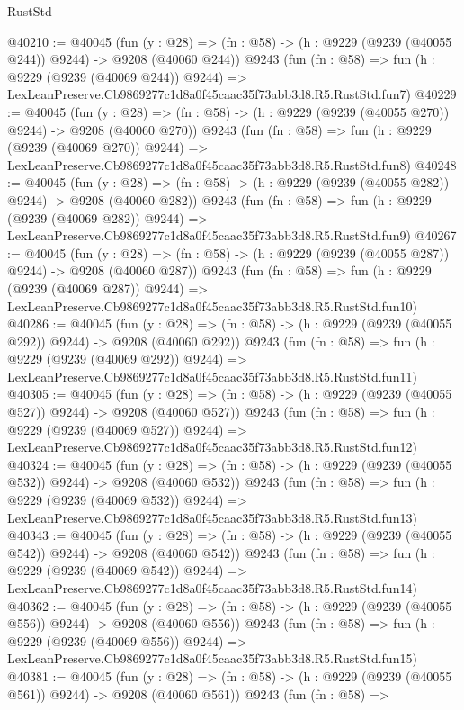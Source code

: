 \begin{lexlean}{RustStd}
\begin{coremodule}
@40210 := @40045
    (fun (y : @28) => (fn : @58) -> (h : @9229 (@9239 (@40055 @244)) @9244) -> @9208 (@40060 @244))
    @9243
    (fun (fn : @58) =>
    fun (h : @9229 (@9239 (@40069 @244)) @9244) =>
    LexLeanPreserve.Cb9869277c1d8a0f45caac35f73abb3d8.R5.RustStd.fun7)
@40229 := @40045
    (fun (y : @28) => (fn : @58) -> (h : @9229 (@9239 (@40055 @270)) @9244) -> @9208 (@40060 @270))
    @9243
    (fun (fn : @58) =>
    fun (h : @9229 (@9239 (@40069 @270)) @9244) =>
    LexLeanPreserve.Cb9869277c1d8a0f45caac35f73abb3d8.R5.RustStd.fun8)
@40248 := @40045
    (fun (y : @28) => (fn : @58) -> (h : @9229 (@9239 (@40055 @282)) @9244) -> @9208 (@40060 @282))
    @9243
    (fun (fn : @58) =>
    fun (h : @9229 (@9239 (@40069 @282)) @9244) =>
    LexLeanPreserve.Cb9869277c1d8a0f45caac35f73abb3d8.R5.RustStd.fun9)
@40267 := @40045
    (fun (y : @28) => (fn : @58) -> (h : @9229 (@9239 (@40055 @287)) @9244) -> @9208 (@40060 @287))
    @9243
    (fun (fn : @58) =>
    fun (h : @9229 (@9239 (@40069 @287)) @9244) =>
    LexLeanPreserve.Cb9869277c1d8a0f45caac35f73abb3d8.R5.RustStd.fun10)
@40286 := @40045
    (fun (y : @28) => (fn : @58) -> (h : @9229 (@9239 (@40055 @292)) @9244) -> @9208 (@40060 @292))
    @9243
    (fun (fn : @58) =>
    fun (h : @9229 (@9239 (@40069 @292)) @9244) =>
    LexLeanPreserve.Cb9869277c1d8a0f45caac35f73abb3d8.R5.RustStd.fun11)
@40305 := @40045
    (fun (y : @28) => (fn : @58) -> (h : @9229 (@9239 (@40055 @527)) @9244) -> @9208 (@40060 @527))
    @9243
    (fun (fn : @58) =>
    fun (h : @9229 (@9239 (@40069 @527)) @9244) =>
    LexLeanPreserve.Cb9869277c1d8a0f45caac35f73abb3d8.R5.RustStd.fun12)
@40324 := @40045
    (fun (y : @28) => (fn : @58) -> (h : @9229 (@9239 (@40055 @532)) @9244) -> @9208 (@40060 @532))
    @9243
    (fun (fn : @58) =>
    fun (h : @9229 (@9239 (@40069 @532)) @9244) =>
    LexLeanPreserve.Cb9869277c1d8a0f45caac35f73abb3d8.R5.RustStd.fun13)
@40343 := @40045
    (fun (y : @28) => (fn : @58) -> (h : @9229 (@9239 (@40055 @542)) @9244) -> @9208 (@40060 @542))
    @9243
    (fun (fn : @58) =>
    fun (h : @9229 (@9239 (@40069 @542)) @9244) =>
    LexLeanPreserve.Cb9869277c1d8a0f45caac35f73abb3d8.R5.RustStd.fun14)
@40362 := @40045
    (fun (y : @28) => (fn : @58) -> (h : @9229 (@9239 (@40055 @556)) @9244) -> @9208 (@40060 @556))
    @9243
    (fun (fn : @58) =>
    fun (h : @9229 (@9239 (@40069 @556)) @9244) =>
    LexLeanPreserve.Cb9869277c1d8a0f45caac35f73abb3d8.R5.RustStd.fun15)
@40381 := @40045
    (fun (y : @28) => (fn : @58) -> (h : @9229 (@9239 (@40055 @561)) @9244) -> @9208 (@40060 @561))
    @9243
    (fun (fn : @58) =>

\end{coremodule}
\end{lexlean}

